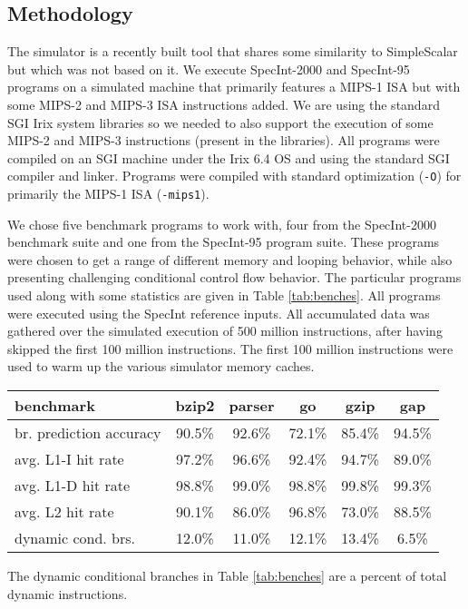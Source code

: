 \documentclass[10pt,twocolumn,dvips]{article}
\begin{document}
\subsection{Methodology}
%
The simulator is a recently built tool that shares some similarity
to SimpleScalar \cite{Austin97} but which was not based on it.
We execute
SpecInt-2000 and SpecInt-95 programs on a simulated machine
that primarily features a MIPS-1 ISA but with some MIPS-2 and
MIPS-3 ISA instructions added.  We are using the standard SGI Irix system
libraries so we needed to also support the execution of some
MIPS-2 and MIPS-3 instructions (present in the libraries).
All programs were compiled on an SGI machine under the
Irix 6.4 OS and using the standard SGI compiler and linker.  
Programs were compiled with
standard optimization ({\tt -O}) for primarily the MIPS-1 ISA ({\tt -mips1}).

We chose five benchmark programs to work with,
four from the SpecInt-2000 benchmark suite
and one from the SpecInt-95 program suite.
These programs were chosen to get a range of different memory and looping
behavior, while also presenting challenging conditional control flow
behavior.
The particular programs used along with some statistics 
are given in Table \ref{tab:benches}.
All programs were executed using the SpecInt reference inputs.
All accumulated data was gathered over the simulated execution of
500 million instructions,
after having skipped the first 100 million instructions.
The first 100 million instructions were used to warm up the
various simulator memory caches.
%
\begin{table*}
\scriptsize{
\begin{center}
\caption{Benchmarks Programs Simulated and Some Statistics.}
\label{tab:benches}
\begin{tabular}{|l|c|c|c|c|c|}
\hline 
benchmark&bzip2&parser&go&gzip&gap\\
\hline 
\hline 
br. prediction accuracy&90.5\%&92.6\%&72.1\%&85.4\%&94.5\%\\
\hline 
avg. L1-I hit rate&97.2\%&96.6\%&92.4\%&94.7\%&89.0\%\\
\hline 
avg. L1-D hit rate&98.8\%&99.0\%&98.8\%&99.8\%&99.3\%\\
\hline 
avg. L2 hit rate&90.1\%&86.0\%&96.8\%&73.0\%&88.5\%\\
\hline 
dynamic cond. brs.&12.0\%&11.0\%&12.1\%&13.4\%&6.5\%\\
\hline
\end{tabular}
\end{center}
}
\end{table*}
%
The dynamic conditional branches in Table \ref{tab:benches} are
a percent of total dynamic instructions.
%
%
\end{document}
